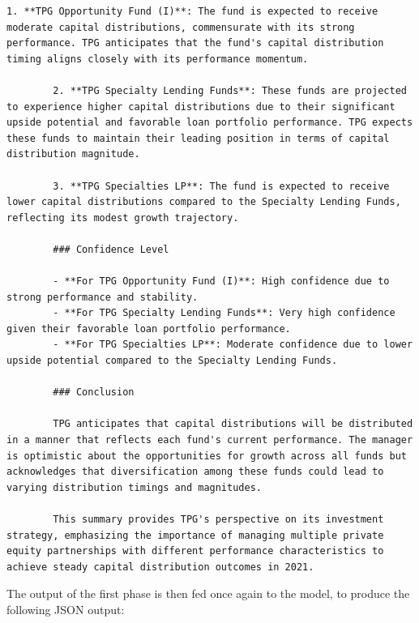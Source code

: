 \begin{lstlisting}[style=cmd, label={lst:oregon_summary}]
        1. **TPG Opportunity Fund (I)**: The fund is expected to receive moderate capital distributions, commensurate with its strong performance. TPG anticipates that the fund's capital distribution timing aligns closely with its performance momentum.

        2. **TPG Specialty Lending Funds**: These funds are projected to experience higher capital distributions due to their significant upside potential and favorable loan portfolio performance. TPG expects these funds to maintain their leading position in terms of capital distribution magnitude.

        3. **TPG Specialties LP**: The fund is expected to receive lower capital distributions compared to the Specialty Lending Funds, reflecting its modest growth trajectory.

        ### Confidence Level

        - **For TPG Opportunity Fund (I)**: High confidence due to strong performance and stability.
        - **For TPG Specialty Lending Funds**: Very high confidence given their favorable loan portfolio performance.
        - **For TPG Specialties LP**: Moderate confidence due to lower upside potential compared to the Specialty Lending Funds.

        ### Conclusion

        TPG anticipates that capital distributions will be distributed in a manner that reflects each fund's current performance. The manager is optimistic about the opportunities for growth across all funds but acknowledges that diversification among these funds could lead to varying distribution timings and magnitudes.

        This summary provides TPG's perspective on its investment strategy, emphasizing the importance of managing multiple private equity partnerships with different performance characteristics to achieve steady capital distribution outcomes in 2021.
    \end{lstlisting}
    
	The output of the first phase is then fed once again to the model, to produce the following JSON output:
    
